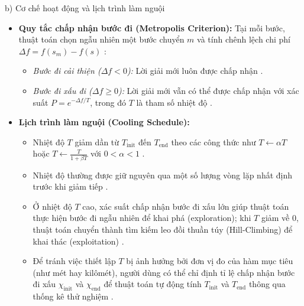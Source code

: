 \documentclass[14pt,a4paper]{extarticle}
\begin{document}
\noindent b) Cơ chế hoạt động và lịch trình làm nguội
\begin{itemize}
    \item \textbf{Quy tắc chấp nhận bước đi (Metropolis Criterion):} Tại mỗi bước, thuật toán chọn ngẫu nhiên một bước chuyển $m$ và tính chênh lệch chi phí $\Delta f = f(s_m) - f(s)$ \cite{Taillard2023}:
    \begin{itemize}
        \item \textit{Bước đi cải thiện ($\Delta f < 0$):} Lời giải mới luôn được chấp nhận \cite{Taillard2023}.
        \item \textit{Bước đi xấu đi ($\Delta f \ge 0$):} Lời giải mới vẫn có thể được chấp nhận với xác suất $P = e^{-\Delta f / T}$, trong đó $T$ là tham số nhiệt độ \cite{Luke2009}.
    \end{itemize}
    \item \textbf{Lịch trình làm nguội (Cooling Schedule):}
    \begin{itemize}
        \item Nhiệt độ $T$ giảm dần từ $T_{\text{init}}$ đến $T_{\text{end}}$ theo các công thức như $T \leftarrow \alpha T$ hoặc $T \leftarrow \frac{T}{1 + \beta T}$ với $0 < \alpha < 1$ \cite{Taillard2023}.
        \item Nhiệt độ thường được giữ nguyên qua một số lượng vòng lặp nhất định trước khi giảm tiếp \cite{Taillard2023}.
        \item Ở nhiệt độ $T$ cao, xác suất chấp nhận bước đi xấu lớn giúp thuật toán thực hiện bước đi ngẫu nhiên để khai phá (exploration); khi $T$ giảm về $0$, thuật toán chuyển thành tìm kiếm leo đồi thuần túy (Hill-Climbing) để khai thác (exploitation) \cite{Luke2009}.
        \item Để tránh việc thiết lập $T$ bị ảnh hưởng bởi đơn vị đo của hàm mục tiêu (như mét hay kilômét), người dùng có thể chỉ định tỉ lệ chấp nhận bước đi xấu $\chi_{\text{init}}$ và $\chi_{\text{end}}$ để thuật toán tự động tính $T_{\text{init}}$ và $T_{\text{end}}$ thông qua thống kê thử nghiệm \cite{Taillard2023}.
    \end{itemize}
\end{itemize}
\end{document}

